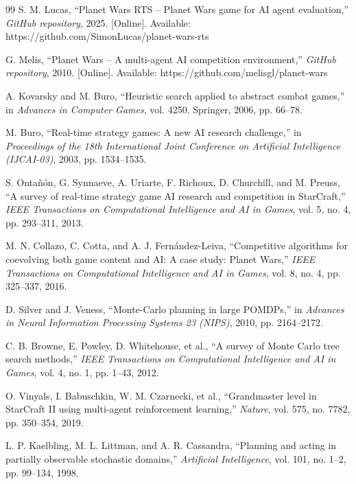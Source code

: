 \documentclass[conference]{IEEEtran}
\begin{document}
\begin{thebibliography}{99}
 S. M. Lucas, ``Planet Wars RTS -- Planet Wars game for AI agent evaluation,'' \textit{GitHub repository}, 2025. [Online]. Available: https://github.com/SimonLucas/planet-wars-rts

 G. Melis, ``Planet Wars -- A multi-agent AI competition environment,'' \textit{GitHub repository}, 2010. [Online]. Available: https://github.com/melisgl/planet-wars

 A. Kovarsky and M. Buro, ``Heuristic search applied to abstract combat games,'' in \textit{Advances in Computer Games}, vol. 4250. Springer, 2006, pp. 66--78.

 M. Buro, ``Real-time strategy games: A new AI research challenge,'' in \textit{Proceedings of the 18th International Joint Conference on Artificial Intelligence (IJCAI-03)}, 2003, pp. 1534--1535.

 S. Ontañón, G. Synnaeve, A. Uriarte, F. Richoux, D. Churchill, and M. Preuss, ``A survey of real-time strategy game AI research and competition in StarCraft,'' \textit{IEEE Transactions on Computational Intelligence and AI in Games}, vol. 5, no. 4, pp. 293--311, 2013.

 M. N. Collazo, C. Cotta, and A. J. Fernández-Leiva, ``Competitive algorithms for coevolving both game content and AI: A case study: Planet Wars,'' \textit{IEEE Transactions on Computational Intelligence and AI in Games}, vol. 8, no. 4, pp. 325--337, 2016.

 D. Silver and J. Veness, ``Monte-Carlo planning in large POMDPs,'' in \textit{Advances in Neural Information Processing Systems 23 (NIPS)}, 2010, pp. 2164--2172.

 C. B. Browne, E. Powley, D. Whitehouse, et al., ``A survey of Monte Carlo tree search methods,'' \textit{IEEE Transactions on Computational Intelligence and AI in Games}, vol. 4, no. 1, pp. 1--43, 2012.



 O. Vinyals, I. Babuschkin, W. M. Czarnecki, et al., ``Grandmaster level in StarCraft II using multi-agent reinforcement learning,'' \textit{Nature}, vol. 575, no. 7782, pp. 350--354, 2019.

 L. P. Kaelbling, M. L. Littman, and A. R. Cassandra, ``Planning and acting in partially observable stochastic domains,'' \textit{Artificial Intelligence}, vol. 101, no. 1--2, pp. 99--134, 1998.


\end{thebibliography}
\end{document}
